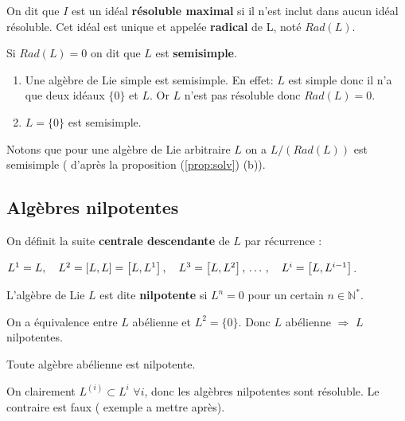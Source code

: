 \documentclass[a4paper,openany,12pt]{report}
\newcommand{\NN}{\mathbb{N}}
\theoremstyle{break}
{\theorembodyfont{\upshape}
\newtheorem*{rmq}{Remarque :}
\newtheorem*{prv}{Preuve :}
\newtheorem*{ex}{Exemples :}
\newtheorem*{exe}{Exemple : }
\newtheorem*{nota}{Notation :}
\newtheorem*{dem}{D\'emonstration :}}
\begin{document}
\begin{df}
\quad On dit que $I$ est un idéal \textbf{résoluble maximal} si il n'est inclut dans aucun idéal résoluble. Cet idéal est unique et appelée \textbf{radical} de L, noté $Rad(L)$.
\end{df}

\begin{df}
\quad Si $Rad (L) = 0$ on dit que $L$ est \textbf{semisimple}.
\end{df}

\begin{ex}
\begin{enumerate}
\item Une algèbre de Lie simple est semisimple.
En effet: $L$ est simple donc il n'a que deux idéaux $\{ 0 \}$ et $L$. Or $L$ n'est pas résoluble donc $Rad (L)= {0}$.

\item $L= \{0\}$ est semisimple.
\end{enumerate}
\end{ex}

Notons que pour une algèbre de Lie arbitraire $L$ on a $L/(Rad (L))$ est semisimple ( d'après la proposition (\ref{prop:solv}) (b)).

\subsection{Algèbres nilpotentes}

On définit la suite \textbf{centrale descendante} de $L$ par récurrence :
\begin{center}
$L^{1}=L, \quad L^{2}=[L, L]=\left[L, L^{1}\right], \quad L^{3}=\left[L, L^{2}\right], \thinspace \ldots \thinspace, \quad L^{i}=\left[L, L^{i-1}\right]$.
\end{center}

\begin{df}
\quad L'algèbre de Lie $L$ est dite \textbf{nilpotente} si $L^{n}=0$ pour un certain $n \in \NN^{*}$.
\end{df}

\begin{rmq}
\quad On a équivalence entre $L$ abélienne et $L^{2}= \{ 0 \}$. Donc $L$ abélienne $\Rightarrow$ $L$ nilpotentes.
\end{rmq}

\begin{exe}
\quad Toute algèbre abélienne est nilpotente.

On clairement $L^{(i)}\subset L^{i}$ $\forall i$, donc les algèbres nilpotentes sont résoluble.
Le contraire est faux ( exemple a mettre après).
\end{exe}
\end{document}
